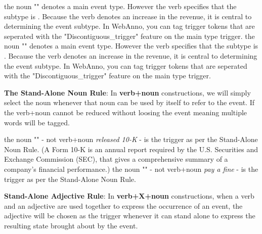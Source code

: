 \begin{exe}
    \ex {} \hspace*{\fill}{(aapl s01)}
        \expl the noun "" denotes a  main event type.
        However the verb  specifies that the subtype is . Because the verb  denotes an increase in the revenue, it is central to determining the event subtype.
        In WebAnno, you can tag trigger tokens that are seperated with the "Discontiguous\_trigger" feature on the main type trigger.
    \ex {} \hspace*{\fill}{(wmt03 s23)}
        \expl the noun "" denotes a  main event type.
        However the verb  specifies that the subtype is . Because the verb  denotes an increase in the revenue, it is central to determining the event subtype.
        In WebAnno, you can tag trigger tokens that are seperated with the "Discontiguous\_trigger" feature on the main type trigger.
\end{exe}

\noindent\textbf{The Stand-Alone Noun Rule}:
In \textbf{verb+noun} constructions, we will simply select the noun whenever that noun can be used by itself to refer to the event.
If the verb+noun cannot be reduced without loosing the event meaning multiple words will be tagged.

\begin{exe}
    \ex {}
        \expl the noun "" - not verb+noun \textit{released 10-K} - is the trigger as per the Stand-Alone Noun Rule. (A Form 10-K is an annual report required by the U.S. Securities and Exchange Commission (SEC), that gives a comprehensive summary of a company's financial performance.)
    \ex {}
        \expl the noun "" - not verb+noun \textit{pay a fine} - is the trigger as per the Stand-Alone Noun Rule.
\end{exe}

\noindent\textbf{Stand-Alone Adjective Rule}:
In \textbf{verb+X+noun} constructions, when a verb and an adjective are used together to express the occurrence of an event, the adjective will be chosen as the trigger whenever it can stand alone to express the resulting state brought about by the event.


